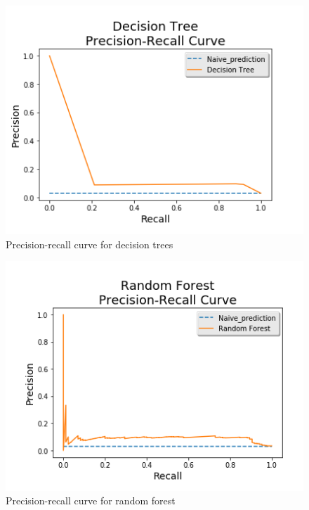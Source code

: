 \documentclass{article}
\begin{document}
\begin{figure}[h] 
\centering
\includegraphics[scale=.9]{DT_PR_curve}

\caption{Precision-recall curve for decision trees}
\label{fig:2}
\end{figure}

 
\begin{figure}[h!]
\centering
\includegraphics[scale=.9]{RF_PR_curve}
\caption{Precision-recall curve for random forest}
\label{fig:3}
\end{figure}

\newpage

\newpage
\end{document}
